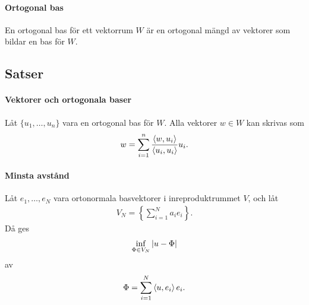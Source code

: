 \paragraph{Ortogonal bas}
En ortogonal bas för ett vektorrum $W$ är en ortogonal mängd av vektorer som bildar en bas för $W$.

\subsection{Satser}

\paragraph{Vektorer och ortogonala baser}
Låt $\{u_1, \dots, u_n\}$ vara en ortogonal bas för $W$. Alla vektorer $w\in W$ kan skrivas som
\begin{align*}
	w = \sum\limits_{i = 1}^n \frac{\expval{w, u_i}}{\expval{u_i, u_i}}u_i.
\end{align*}

\proof

\paragraph{Minsta avstånd}
Låt $e_{1}, \dots, e_{N}$ vara ortonormala basvektorer i inreproduktrummet $V$, och låt
\begin{align*}
	V_{N} = \left\{\sum\limits_{i = 1}^{N}a_{i}e_{i}\right\}.
\end{align*}
Då ges
\begin{align*}
	\inf\limits_{\Phi\in V_{N}}\abs{u - \Phi}
\end{align*}
av
\begin{align*}
	\Phi = \sum\limits_{i = 1}^{N}\expval{u, e_{i}}e_{i}.
\end{align*}

\proof